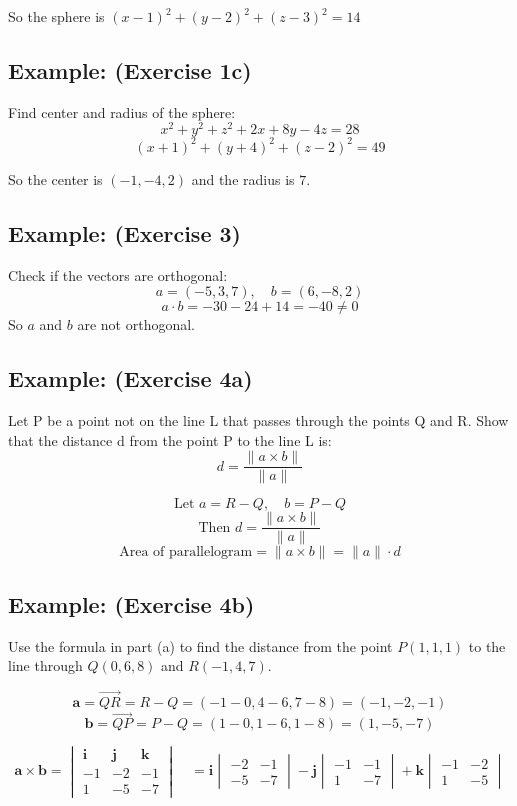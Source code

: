 \documentclass[11pt]{article}
\begin{document}
So the sphere is $(x-1)^2 + (y-2)^2 + (z-3)^2 = 14$

\subsection*{Example: (Exercise 1c)}
Find center and radius of the sphere:
\[
x^2 + y^2 + z^2 + 2x + 8y - 4z = 28
\]
\[
(x+1)^2 + (y+4)^2 + (z-2)^2 = 49
\]

So the center is $(-1,-4,2)$ and the radius is $7$.

\subsection*{Example: (Exercise 3)}
Check if the vectors are orthogonal:
\[
a = (-5,3,7), \quad b = (6,-8,2)
\]
\[
a \cdot b = -30 - 24 + 14 = -40 \neq 0
\]
So $a$ and $b$ are not orthogonal.

\subsection*{Example: (Exercise 4a)}
Let P be a point not on the line L that passes through the points Q and R. Show that the
distance d from the point P to the line L is:
\[
d = \frac{\|a \times b\|}{\|a\|}
\]

\[
\text{Let } a = R - Q, \quad b =  P - Q
\]
\[
\text{Then } d = \frac{\|a \times b\|}{\|a\|}
\]
\[
\text{Area of parallelogram} = \|a \times b\| = \|a\| \cdot d
\]

\subsection*{Example: (Exercise 4b)}
Use the formula in part (a) to find the distance from the point $P(1, 1, 1)$ to the line through $Q(0, 6, 8)$ and $R(-1, 4, 7)$.

\[
\mathbf{a} = \overrightarrow{QR} = R - Q = (-1 - 0, 4 - 6, 7 - 8) = (-1, -2, -1)
\]
\[
\mathbf{b} = \overrightarrow{QP} = P - Q = (1 - 0, 1 - 6, 1 - 8) = (1, -5, -7)
\]

\[
\mathbf{a} \times \mathbf{b} =
\begin{vmatrix}
\mathbf{i} & \mathbf{j} & \mathbf{k} \\
-1 & -2 & -1 \\
1 & -5 & -7
\end{vmatrix}
\quad
= \mathbf{i} \begin{vmatrix} -2 & -1 \\ -5 & -7 \end{vmatrix}
- \mathbf{j} \begin{vmatrix} -1 & -1 \\ 1 & -7 \end{vmatrix}
+ \mathbf{k} \begin{vmatrix} -1 & -2 \\ 1 & -5 \end{vmatrix}
\]
\end{document}
